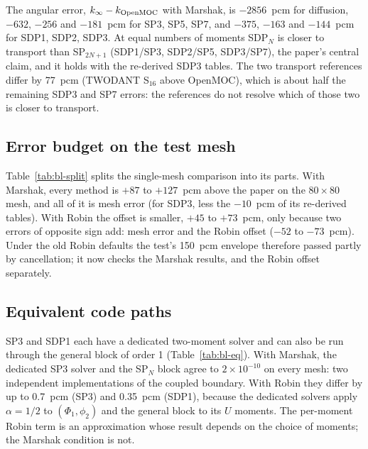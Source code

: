 The angular error, $k_\infty - k_{\rm OpenMOC}$ with Marshak, is
$-2856$~pcm for diffusion, $-632$, $-256$ and $-181$~pcm for SP3, SP5, SP7,
and $-375$, $-163$ and $-144$~pcm for SDP1, SDP2, SDP3. At equal numbers of
moments SDP$_N$ is closer to transport than SP$_{2N+1}$ (SDP1/SP3,
SDP2/SP5, SDP3/SP7), the paper's central claim, and it holds with the
re-derived SDP3 tables. The two transport references differ by 77~pcm
(TWODANT S$_{16}$ above OpenMOC), which is about half the remaining SDP3 and
SP7 errors: the references do not resolve which of those two is closer to
transport.

\subsection{Error budget on the test mesh}

\begin{table}[h]
\caption{Brantley--Larsen error budget (pcm). Mesh error is $k_{80} - k_\infty$
with Marshak. The last two columns are the single-mesh comparison of the
validation test on the $80 \times 80$ mesh, with each vacuum treatment.}
\label{tab:bl-split}
\end{table}

Table~\ref{tab:bl-split} splits the single-mesh comparison into its parts.
With Marshak, every method is $+87$ to $+127$~pcm above the paper on the
$80 \times 80$ mesh, and all of it is mesh error (for SDP3, less the
$-10$~pcm of its re-derived tables). With Robin the offset is
smaller, $+45$ to $+73$~pcm, only because two errors of opposite sign add:
mesh error and the Robin offset ($-52$ to $-73$~pcm). Under the old Robin
defaults the test's 150~pcm envelope therefore passed partly by
cancellation; it now checks the Marshak results, and the Robin offset
separately.

\subsection{Equivalent code paths}

\begin{table}[h]
\caption{Dedicated solvers against the general SP$_N$/SDP$_N$ block of the same order.}
\label{tab:bl-eq}
\end{table}

SP3 and SDP1 each have a dedicated two-moment solver and can also be run
through the general block of order 1 (Table~\ref{tab:bl-eq}). With Marshak,
the dedicated SP3 solver and the SP$_N$ block agree to $2 \times 10^{-10}$ on
every mesh: two independent implementations of the coupled boundary. With
Robin they differ by up to 0.7~pcm (SP3) and 0.35~pcm (SDP1), because the
dedicated solvers apply $\alpha = 1/2$ to $(\Phi_1, \phi_2)$ and the general
block to its $U$ moments. The per-moment Robin term is an approximation
whose result depends on the choice of moments; the Marshak condition is not.

